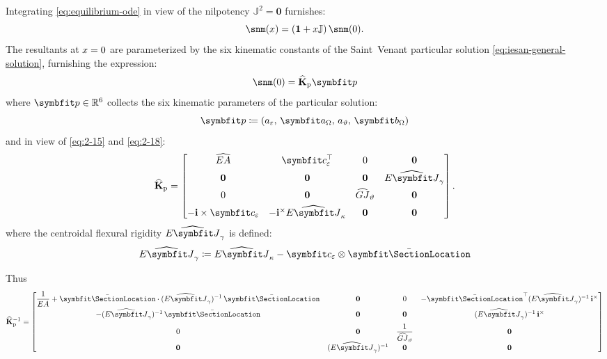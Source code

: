 Integrating \eqref{eq:equilibrium-ode} in view of the nilpotency \(\mathbb{J}^2 = \mathbf{0}\) furnishes:
\begin{equation}
\snm(x) = (\mathbf{1} + \reflenx\mathbb{J})\,\snm(0).
\label{eq:resultant-evolution}
\end{equation}
The resultants at \(x=0\) are parameterized by the six kinematic constants of the Saint~Venant particular solution \eqref{eq:iesan-general-solution}, furnishing the expression:
\begin{equation}
\snm(0) = \IesanStiff\IesanVector
\label{eq:snm0-in-p}
\end{equation}
where \(\IesanVector\in\mathbb{R}^6\) collects the six kinematic  parameters of the particular solution: 
\begin{equation}
\IesanVector \coloneq (a_{\varepsilon},\, \bm{a}_{\Section},\, a_{\vartheta},\, \bm{b}_{\Section})
\label{eq:def-iesan-vector}
\end{equation}
and in view of \eqref{eq:2-15} and \eqref{eq:2-18}:
\begin{equation}
\IesanStiff = \begin{bmatrix}
\AxialRigidity & \AxialCoupling^\top & 0 & \mathbf{0} \\[4pt]
\mathbf{0} & \mathbf{0} & \mathbf{0} & \ShearRigidity \\[4pt]
0 & \mathbf{0} & \TwistRigidity & \mathbf{0} \\[4pt]
-\FrameBasis\times \AxialCoupling& -\FrameBasis^\times \CoupleRigidity & \mathbf{0} & \mathbf{0}
\end{bmatrix}.
\label{eq:G0-neg-m}
\end{equation}
where the centroidal flexural rigidity \(\ShearRigidity\) is defined: 
\begin{equation}
    \ShearRigidity \coloneq \CoupleRigidity - \AxialCoupling\otimes\CentroidLocation
\label{eq:def-intRGoRG}
\end{equation}
\begin{Details}
Thus
\begin{equation}
\IesanStiff^{-1} =
\begin{bmatrix}
\displaystyle \frac{1}{EA} + \CentroidLocation\cdot (\ShearRigidity)^{-1}\,\CentroidLocation
& \mathbf{0}
& 0
& -\CentroidLocation^\top (\ShearRigidity)^{-1}\,\FrameBasis^\times
\\[6pt]
-(\ShearRigidity)^{-1}\,\CentroidLocation
& \mathbf{0}
& \mathbf{0}
& (\ShearRigidity)^{-1}\,\FrameBasis^\times
\\[6pt]
0
& \mathbf{0}
& \displaystyle \frac{1}{\TwistRigidity}
& \mathbf{0}
\\[6pt]
\mathbf{0}
& (\ShearRigidity)^{-1}
& \mathbf{0}
& \mathbf{0}
\end{bmatrix}
\label{eq:G0-inv-neg-m}
\end{equation}
\end{Details}
